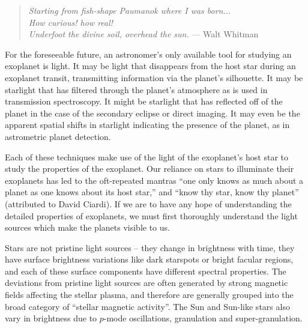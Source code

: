 \documentclass[12pt, twoside]{uwthesis}
\begin{document}
\begin{quote}
{\it Starting from fish-shape Paumanok where I was born...\\
How curious! how real!\\
Underfoot the divine soil, overhead the sun.}
\hfill --- Walt Whitman
\end{quote}

For the foreseeable future, an astronomer's only available tool for studying an exoplanet is light. It may be light that disappears from the host star during an exoplanet transit, transmitting information via the planet's silhouette. It may be starlight that has filtered through the planet's atmosphere as is used in transmission spectroscopy. It might be starlight that has reflected off of the planet in the case of the secondary eclipse or direct imaging. It may even be the apparent spatial shifts in starlight indicating the presence of the planet, as in astrometric planet detection.

Each of these techniques make use of the light of the exoplanet's host star to study the properties of the exoplanet. Our reliance on stars to illuminate their exoplanets has led to the oft-repeated mantras ``one only knows as much about a planet as one knows about its host star,'' and ``know thy star, know thy planet'' (attributed to David Ciardi). If we are to have any hope of understanding the detailed properties of exoplanets, we must first thoroughly understand the light sources which make the planets visible to us. 

Stars are not pristine light sources -- they change in brightness with time, they have surface brightness variations like dark starspots or bright facular regions, and each of these surface components have different spectral properties. The deviations from pristine light sources are often generated by strong magnetic fields affecting the stellar plasma, and therefore are generally grouped into the broad category of ``stellar magnetic activity''. The Sun and Sun-like stars also vary in brightness due to $p$-mode oscillations, granulation and super-granulation.
\end{document}
